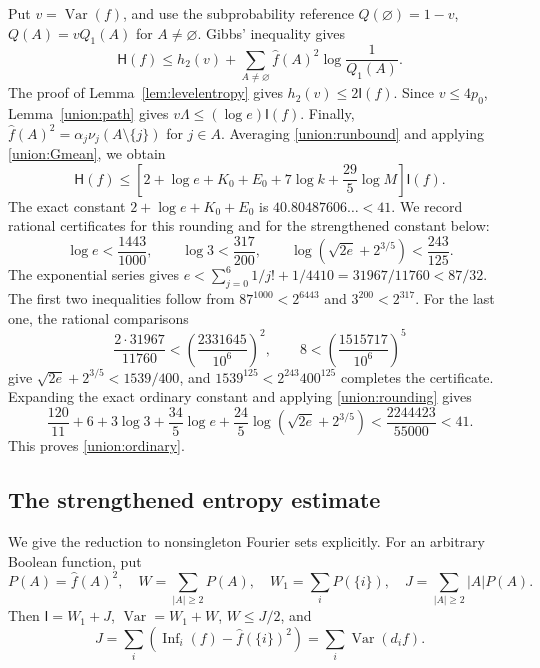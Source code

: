 \documentclass[11pt]{amsart}
\theoremstyle{definition}
\theoremstyle{remark}
\newcommand{\HH}{\mathsf H}
\newcommand{\I}{\mathsf I}
\DeclareMathOperator{\Var}{Var}
\DeclareMathOperator{\Inf}{Inf}
\newcommand{\wh}[1]{\widehat{#1}}
\begin{document}
Put $v=\Var(f)$, and use the subprobability reference
$Q(\varnothing)=1-v$, $Q(A)=vQ_1(A)$ for $A\ne\varnothing$.
Gibbs' inequality gives
\[
 \HH(f)\le h_2(v)+
 \sum_{A\ne\varnothing}\wh f(A)^2\log\frac1{Q_1(A)}.
\]
The proof of Lemma~\ref{lem:levelentropy} gives $h_2(v)\le2\I(f)$.
Since $v\le4p_0$, Lemma~\ref{union:path} gives $v\Lambda\le(\log e)\I(f)$.
Finally,
$\wh f(A)^2=\alpha_j\nu_j(A\setminus\{j\})$ for $j\in A$.
Averaging \eqref{union:runbound} and applying \eqref{union:Gmean}, we obtain
\[
 \HH(f)\le
 \left[2+\log e+K_0+E_0+7\log k+\frac{29}{5}\log M\right]\I(f).
\]
The exact constant $2+\log e+K_0+E_0$ is $40.80487606\ldots<41$.
We record rational certificates for this rounding and for the strengthened constant below:
\begin{equation}\label{union:rounding}
 \log e<\frac{1443}{1000},\qquad
 \log3<\frac{317}{200},\qquad
 \log(\sqrt{2e}+2^{3/5})<\frac{243}{125}.
\end{equation}
The exponential series gives
$e<\sum_{j=0}^6 1/j!+1/4410=31967/11760<87/32$.
The first two inequalities follow from $87^{1000}<2^{6443}$ and $3^{200}<2^{317}$.
For the last one, the rational comparisons
\[
 \frac{2\cdot31967}{11760}
   <\left(\frac{2331645}{10^6}\right)^2,\qquad
 8<\left(\frac{1515717}{10^6}\right)^5
\]
give $\sqrt{2e}+2^{3/5}<1539/400$, and
$1539^{125}<2^{243}400^{125}$ completes the certificate.
Expanding the exact ordinary constant and applying \eqref{union:rounding} gives
\[
 \frac{120}{11}+6+3\log3+\frac{34}{5}\log e
       +\frac{24}{5}\log(\sqrt{2e}+2^{3/5})
 <\frac{2244423}{55000}<41.
\]
This proves \eqref{union:ordinary}.

\subsection{The strengthened entropy estimate}

We give the reduction to nonsingleton Fourier sets explicitly.
For an arbitrary Boolean function, put
\[
 P(A)=\wh f(A)^2,\quad
 W=\sum_{|A|\ge2}P(A),\quad
 W_1=\sum_iP(\{i\}),\quad
 J=\sum_{|A|\ge2}|A|P(A).
\]
Then $\I=W_1+J$, $\Var=W_1+W$, $W\le J/2$, and
\begin{equation}\label{union:Jderiv}
 J=\sum_i\left(\Inf_i(f)-\wh f(\{i\})^2\right)
   =\sum_i\Var(d_if).
\end{equation}
\end{document}
